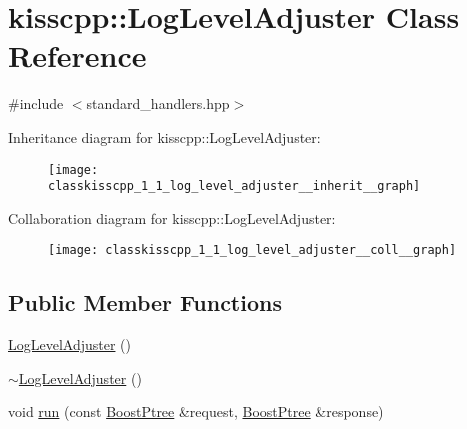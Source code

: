 \hypertarget{classkisscpp_1_1_log_level_adjuster}{\section{kisscpp\-:\-:Log\-Level\-Adjuster Class Reference}
\label{classkisscpp_1_1_log_level_adjuster}
}


{\ttfamily \#include $<$standard\-\_\-handlers.\-hpp$>$}



Inheritance diagram for kisscpp\-:\-:Log\-Level\-Adjuster\-:
\nopagebreak
\begin{figure}[H]
\begin{center}
\leavevmode
\texttt{[image: classkisscpp\_1\_1\_log\_level\_adjuster\_\_inherit\_\_graph]}
\end{center}
\end{figure}


Collaboration diagram for kisscpp\-:\-:Log\-Level\-Adjuster\-:
\nopagebreak
\begin{figure}[H]
\begin{center}
\leavevmode
\texttt{[image: classkisscpp\_1\_1\_log\_level\_adjuster\_\_coll\_\_graph]}
\end{center}
\end{figure}
\subsection*{Public Member Functions}
\begin{DoxyCompactItemize}
\item 
\hyperlink{classkisscpp_1_1_log_level_adjuster_a59d882a82f2f8ab581278b053066ec99}{Log\-Level\-Adjuster} ()
\item 
\hyperlink{classkisscpp_1_1_log_level_adjuster_a631d7d4e29b6069219e92a7835189bb5}{$\sim$\-Log\-Level\-Adjuster} ()
\item 
void \hyperlink{classkisscpp_1_1_log_level_adjuster_a971d59364d21bbaa283ea520caefa604}{run} (const \hyperlink{boost__ptree_8hpp_ab36820650b8e0db36402aea80485633c}{Boost\-Ptree} \&request, \hyperlink{boost__ptree_8hpp_ab36820650b8e0db36402aea80485633c}{Boost\-Ptree} \&response)
\end{DoxyCompactItemize}



